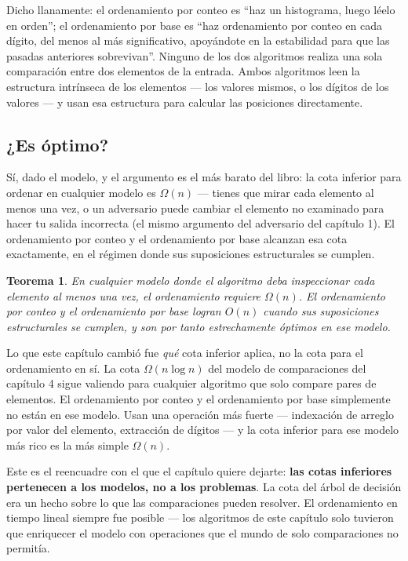 \documentclass[11pt,a4paper]{article}
\newtheorem{teorema}{Teorema}
\begin{document}
Dicho llanamente: el ordenamiento por conteo es ``haz un histograma, luego léelo en orden''; el ordenamiento por base es ``haz ordenamiento por conteo en cada dígito, del menos al más significativo, apoyándote en la estabilidad para que las pasadas anteriores sobrevivan''. Ninguno de los dos algoritmos realiza una sola comparación entre dos elementos de la entrada. Ambos algoritmos leen la estructura intrínseca de los elementos --- los valores mismos, o los dígitos de los valores --- y usan esa estructura para calcular las posiciones directamente.

\subsection*{¿Es óptimo?}

Sí, dado el modelo, y el argumento es el más barato del libro: la cota inferior para ordenar en cualquier modelo es $\Omega(n)$ --- tienes que mirar cada elemento al menos una vez, o un adversario puede cambiar el elemento no examinado para hacer tu salida incorrecta (el mismo argumento del adversario del capítulo 1). El ordenamiento por conteo y el ordenamiento por base alcanzan esa cota exactamente, en el régimen donde sus suposiciones estructurales se cumplen.

\begin{teorema}
En cualquier modelo donde el algoritmo deba inspeccionar cada elemento al menos una vez, el ordenamiento requiere $\Omega(n)$. El ordenamiento por conteo y el ordenamiento por base logran $O(n)$ cuando sus suposiciones estructurales se cumplen, y son por tanto estrechamente óptimos en ese modelo.
\end{teorema}

Lo que este capítulo cambió fue \emph{qué} cota inferior aplica, no la cota para el ordenamiento en sí. La cota $\Omega(n \log n)$ del modelo de comparaciones del capítulo 4 sigue valiendo para cualquier algoritmo que solo compare pares de elementos. El ordenamiento por conteo y el ordenamiento por base simplemente no están en ese modelo. Usan una operación más fuerte --- indexación de arreglo por valor del elemento, extracción de dígitos --- y la cota inferior para ese modelo más rico es la más simple $\Omega(n)$.

Este es el reencuadre con el que el capítulo quiere dejarte: \textbf{las cotas inferiores pertenecen a los modelos, no a los problemas}. La cota del árbol de decisión era un hecho sobre lo que las comparaciones pueden resolver. El ordenamiento en tiempo lineal siempre fue posible --- los algoritmos de este capítulo solo tuvieron que enriquecer el modelo con operaciones que el mundo de solo comparaciones no permitía.
\end{document}
